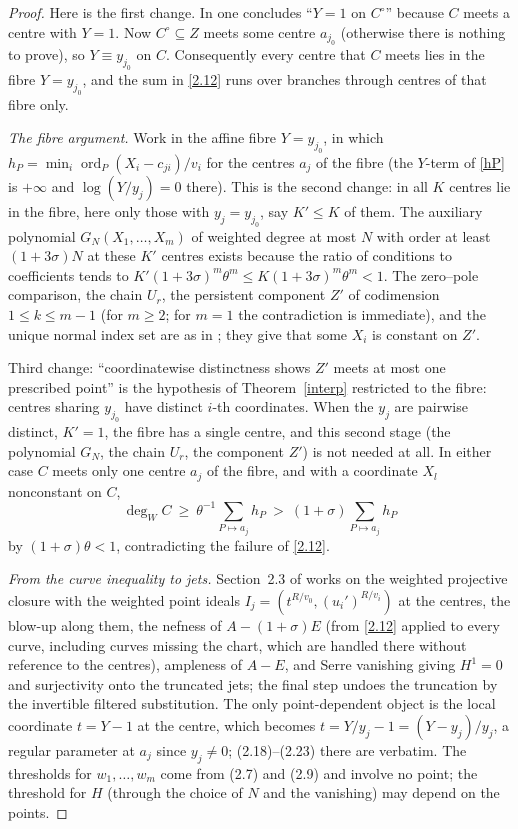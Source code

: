 \documentclass[11pt]{amsart}
\newcommand{\ord}{\operatorname{ord}}
\newcommand{\degW}{\deg_W}
\begin{document}
\begin{proof}
Here is the first change. In \cite{OAI} one concludes ``$Y=1$ on $C^\circ$'' because $C$ meets a centre with $Y=1$. Now $C^\circ\subseteq Z$ meets some centre $a_{j_0}$ (otherwise there is nothing to prove), so $Y\equiv y_{j_0}$ on $C$. Consequently every centre that $C$ meets lies in the fibre $Y=y_{j_0}$, and the sum in \eqref{2.12} runs over branches through centres of that fibre only.

\emph{The fibre argument.} Work in the affine fibre $Y=y_{j_0}$, in which $h_P=\min_i\ord_P(X_i-c_{ji})/v_i$ for the centres $a_j$ of the fibre (the $Y$-term of \eqref{hP} is $+\infty$ and $\log(Y/y_j)=0$ there). This is the second change: in \cite{OAI} all $K$ centres lie in the fibre, here only those with $y_j=y_{j_0}$, say $K'\le K$ of them. The auxiliary polynomial $G_N(X_1,\dots,X_m)$ of weighted degree at most $N$ with order at least $(1+3\sigma)N$ at these $K'$ centres exists because the ratio of conditions to coefficients tends to $K'(1+3\sigma)^m\theta^m\le K(1+3\sigma)^m\theta^m<1$. The zero--pole comparison, the chain $U_r$, the persistent component $Z'$ of codimension $1\le k\le m-1$ (for $m\ge2$; for $m=1$ the contradiction is immediate), and the unique normal index set are as in \cite{OAI}; they give that some $X_i$ is constant on $Z'$.

Third change: ``coordinatewise distinctness shows $Z'$ meets at most one prescribed point'' is the hypothesis of Theorem~\ref{interp} restricted to the fibre: centres sharing $y_{j_0}$ have distinct $i$-th coordinates. When the $y_j$ are pairwise distinct, $K'=1$, the fibre has a single centre, and this second stage (the polynomial $G_N$, the chain $U_r$, the component $Z'$) is not needed at all. In either case $C$ meets only one centre $a_j$ of the fibre, and with a coordinate $X_l$ nonconstant on $C$,
\[
\degW C\ \ge\ \theta^{-1}\sum_{P\mapsto a_j}h_P\ >\ (1+\sigma)\sum_{P\mapsto a_j}h_P
\]
by $(1+\sigma)\theta<1$, contradicting the failure of \eqref{2.12}.

\emph{From the curve inequality to jets.} Section~2.3 of \cite{OAI} works on the weighted projective closure with the weighted point ideals $I_j=(t^{R/v_0},(u_i')^{R/v_i})$ at the centres, the blow-up along them, the nefness of $A-(1+\sigma)E$ (from \eqref{2.12} applied to every curve, including curves missing the chart, which are handled there without reference to the centres), ampleness of $A-E$, and Serre vanishing giving $H^1=0$ and surjectivity onto the truncated jets; the final step undoes the truncation by the invertible filtered substitution. The only point-dependent object is the local coordinate $t=Y-1$ at the centre, which becomes $t=Y/y_j-1=(Y-y_j)/y_j$, a regular parameter at $a_j$ since $y_j\ne0$; (2.18)--(2.23) there are verbatim. The thresholds for $w_1,\dots,w_m$ come from (2.7) and (2.9) and involve no point; the threshold for $H$ (through the choice of $N$ and the vanishing) may depend on the points.
\end{proof}
\end{document}
